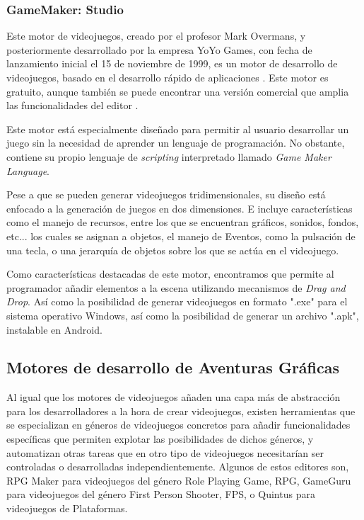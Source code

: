 \subsubsection{GameMaker: Studio}

Este motor de videojuegos, creado por el profesor Mark Overmans, y posteriormente desarrollado por la empresa YoYo Games, con fecha de lanzamiento inicial el 15 de noviembre de 1999, es un motor de desarrollo de videojuegos, basado en el desarrollo rápido de aplicaciones \cite{gamemaker}. Este motor es gratuito, aunque también se puede encontrar una versión comercial que amplia las funcionalidades del editor \cite{gamemaker}.

Este motor está especialmente diseñado para permitir al usuario desarrollar un juego sin la necesidad de aprender un lenguaje de programación. No obstante, contiene su propio lenguaje de \textit{scripting} interpretado llamado \textit{Game Maker Language}.

Pese a que se pueden generar videojuegos tridimensionales, su diseño está enfocado a la generación de juegos en dos dimensiones. E incluye características como el manejo de recursos, entre los que se encuentran gráficos, sonidos, fondos, etc... los cuales se asignan a objetos, el manejo de Eventos, como la pulsación de una tecla, o una jerarquía de objetos sobre los que se actúa en el videojuego.

Como características destacadas de este motor, encontramos que permite al programador añadir elementos a la escena utilizando mecanismos de \textit{Drag and Drop}. Así como la posibilidad de generar videojuegos en formato ".exe" para el sistema operativo Windows, así como la posibilidad de generar un archivo ".apk", instalable en Android.

\subsection{Motores de desarrollo de Aventuras Gráficas}
\label{herramientasaventuras}

Al igual que los motores de videojuegos añaden una capa más de abstracción para los desarrolladores a la hora de crear videojuegos, existen herramientas que se especializan en géneros de videojuegos concretos para añadir funcionalidades específicas que permiten explotar las posibilidades de dichos géneros, y automatizan otras tareas que en otro tipo de videojuegos necesitarían ser controladas o desarrolladas independientemente. Algunos de estos editores son, RPG Maker para videojuegos del género Role Playing Game, RPG, GameGuru para videojuegos del género First Person Shooter, FPS, o Quintus para videojuegos de Plataformas.

